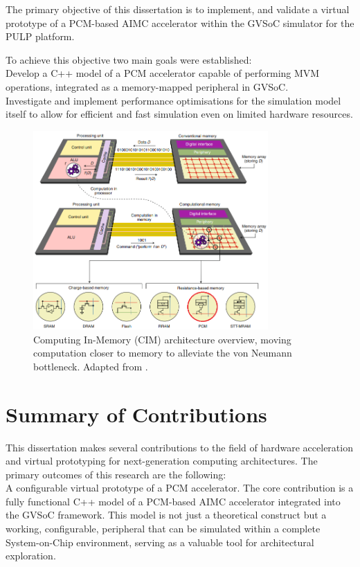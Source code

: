 The primary objective of this dissertation is to implement, and validate a virtual prototype of a PCM-based AIMC accelerator within the GVSoC \cite{bruschi_gvsoc_2021} simulator for the PULP platform.

To achieve this objective two main goals were established:\\
Develop a C++ model of a PCM accelerator capable of performing MVM operations, integrated as a memory-mapped peripheral in GVSoC.\\
Investigate and implement performance optimisations for the simulation model itself to allow for efficient and fast simulation even on limited hardware resources.

\begin{figure}[H]
  \centering
  \includegraphics[width=0.8\textwidth]{Figures/CIM.png}
  \caption{Computing In-Memory (CIM) architecture overview, moving computation closer to memory to alleviate the von Neumann bottleneck. Adapted from \cite{sebastian_memory_2020}.}
  \label{fig:cim}
\end{figure}

\section{Summary of Contributions}\label{sec:contri}
This dissertation makes several contributions to the field of hardware acceleration and virtual prototyping for next-generation computing architectures. 
The primary outcomes of this research are the following:\\
A configurable virtual prototype of a PCM accelerator. 
The core contribution is a fully functional C++ model of a PCM-based AIMC accelerator integrated into the GVSoC framework. 
This model is not just a theoretical construct but a working, configurable, peripheral that can be simulated within a complete System-on-Chip 
environment, serving as a valuable tool for architectural exploration.\\


